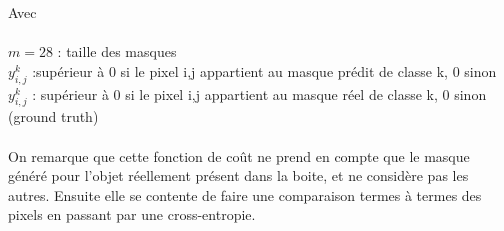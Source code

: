 Avec \\
\\
$m = 28$ : taille des masques \\
$y^k_{i,j}$ :supérieur à 0 si le pixel i,j appartient au masque prédit de classe k, 0 sinon \\
$y^k_{i,j}$ : supérieur à 0 si le pixel i,j appartient au masque réel de classe k, 0 sinon (ground truth)\\ 
\\
On remarque que cette fonction de coût ne prend en compte que le masque généré pour l'objet réellement présent dans la boite, et ne considère pas les autres. Ensuite elle se contente de faire une comparaison termes à termes des pixels en passant par une cross-entropie.